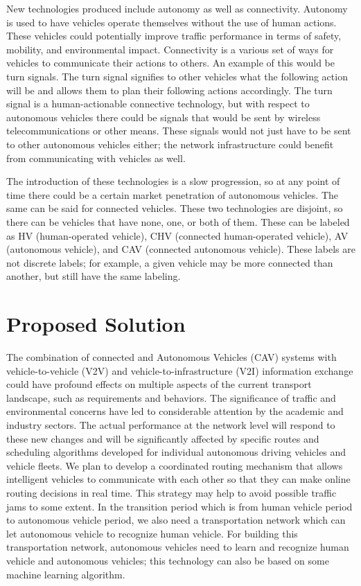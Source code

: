 \documentclass[10pt,letterpaper,draftclsnofoot,onecolumn]{IEEEtran}
\begin{document}
New technologies produced include autonomy as well as connectivity. Autonomy is used to have vehicles operate themselves without the use of human actions. These vehicles could potentially improve traffic performance in terms of safety, mobility, and environmental impact. Connectivity is a various set of ways for vehicles to communicate their actions to others. An example of this would be turn signals. The turn signal signifies to other vehicles what the following action will be and allows them to plan their following actions accordingly. The turn signal is a human-actionable connective technology, but with respect to autonomous vehicles there could be signals that would be sent by wireless telecommunications or other means. These signals would not just have to be sent to other autonomous vehicles either; the network infrastructure could benefit from communicating with vehicles as well.

The introduction of these technologies is a slow progression, so at any point of time there could be a certain market penetration of autonomous vehicles. The same can be said for connected vehicles. These two technologies are disjoint, so there can be vehicles that have none, one, or both of them. These can be labeled as HV (human-operated vehicle), CHV (connected human-operated vehicle), AV (autonomous vehicle), and CAV (connected autonomous vehicle). These labels are not discrete labels; for example, a given vehicle may be more connected than another, but still have the same labeling.
\section{Proposed Solution}
The combination of connected and Autonomous Vehicles (CAV) systems with vehicle-to-vehicle (V2V) and vehicle-to-infrastructure (V2I) information exchange could have profound effects on multiple aspects of the current transport landscape, such as requirements and behaviors. The significance of traffic and environmental concerns have led to considerable attention by the academic and industry sectors. The actual performance at the network level will respond to these new changes and will be significantly affected by specific routes and scheduling algorithms developed for individual autonomous driving vehicles and vehicle fleets. We plan to develop a coordinated routing mechanism that allows intelligent vehicles to communicate with each other so that they can make online routing decisions in real time. This strategy may help to avoid possible traffic jams to some extent. In the transition period which is from human vehicle period to autonomous vehicle period, we also need a transportation network which can let autonomous vehicle to recognize human vehicle. For building this transportation network, autonomous vehicles need to learn and recognize human vehicle and autonomous vehicles; this technology can also be based on some machine learning algorithm.
\end{document}
